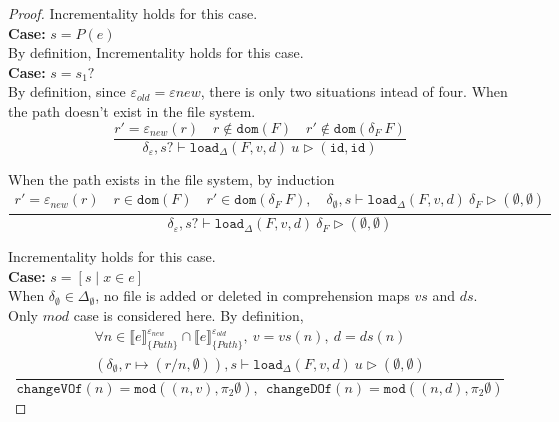 \documentclass[10pt,twoside,a4paper]{article}
\theoremstyle{theorem}
\theoremstyle{lemma}
\theoremstyle{property}
\theoremstyle{definition}
\theoremstyle{assumption}
\def\snd{\pi_2}
\begin{document}
\begin{proof}
	Incrementality holds for this case.\\

	\textbf{Case: } $s = P(e)$\\

		By definition, Incrementality holds for this case.\\

	\textbf{Case: } $s = s_1?$\\

	By definition, since $\varepsilon_{old} = \varepsilon{new}$, there is only two situations intead of four. When the path doesn't exist in the file system.
	\begin{displaymath}
	\frac{
		r' = \varepsilon_{new}(r) \quad r \notin \mathtt{dom}(F) \quad r' \notin \mathtt{dom}(\delta_F~F)
	}
	{\delta_\varepsilon, s? \vdash \mathtt{load}_\Delta (F,v,d)~ u \rhd (\mathtt{id}, \mathtt{id})}
	\end{displaymath}

	When the path exists in the file system, by induction
	\begin{displaymath}
	\frac{\begin{array}{c}
	r' = \varepsilon_{new}(r) \quad r \in \mathtt{dom}(F) \quad r' \in \mathtt{dom}(\delta_F~F), \quad
		\delta_{\emptyset}, s \vdash \mathtt{load}_\Delta (F,v,d)~ \delta_F \rhd (\emptyset, \emptyset)
	\end{array}}
	{\delta_\varepsilon, s? \vdash \mathtt{load}_\Delta (F,v,d)~ \delta_F \rhd (\emptyset,\emptyset)}
	\end{displaymath}

	Incrementality holds for this case.\\

	\textbf{Case: } $s = [ s \mid x \in e]$\\

	When $\delta_{\emptyset} \in \Delta_{\emptyset}$, no file is added or deleted in comprehension maps $vs$ and $ds$. Only $mod$ case is considered here. By definition,
	\begin{displaymath}
		\frac{\begin{array}{c}
		\forall n \in \llbracket e \rrbracket^{\varepsilon_{new}}_{\{Path\}} \cap \llbracket e \rrbracket^{\varepsilon_{old}}_{\{Path\}}, ~ v = vs(n), ~d = ds(n)\\
		(\delta_{\emptyset}, r \mapsto (r/n, \emptyset)), s \vdash \mathtt{load}_\Delta (F,v,d)~ u \rhd (\emptyset,\emptyset)
		\end{array}}
		{\mathtt{changeVOf}(n) = \mathtt{mod}((n,v), \snd\emptyset), ~~\mathtt{changeDOf}(n) = \mathtt{mod}((n,d), \snd\emptyset)}
	\end{displaymath}


\end{proof}
\end{document}
